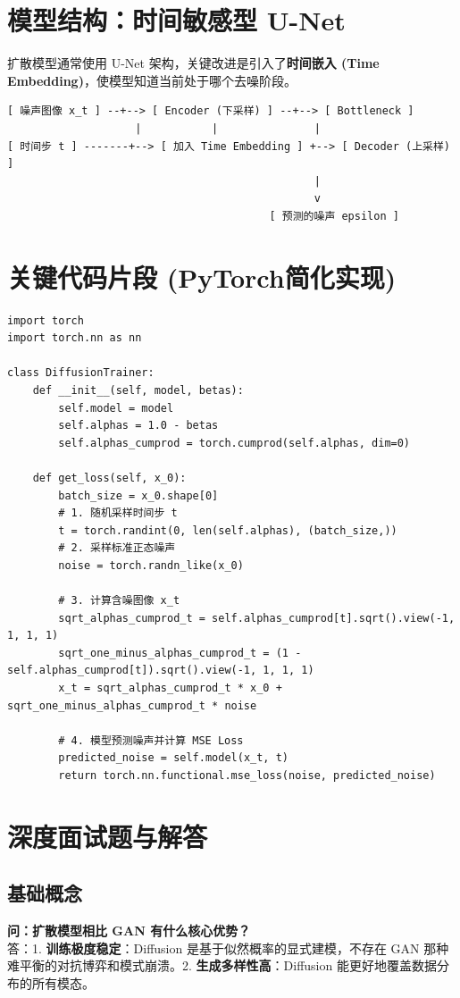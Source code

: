 \documentclass[12pt, a4paper]{article}
\begin{document}
\section{模型结构：时间敏感型 U-Net}
扩散模型通常使用 U-Net 架构，关键改进是引入了\textbf{时间嵌入 (Time Embedding)}，使模型知道当前处于哪个去噪阶段。
\begin{verbatim}
[ 噪声图像 x_t ] --+--> [ Encoder (下采样) ] --+--> [ Bottleneck ]
                    |           |               |
[ 时间步 t ] -------+--> [ 加入 Time Embedding ] +--> [ Decoder (上采样) ]
                                                |
                                                v
                                         [ 预测的噪声 epsilon ]
\end{verbatim}

\section{关键代码片段 (PyTorch简化实现)}
\begin{lstlisting}
import torch
import torch.nn as nn

class DiffusionTrainer:
    def __init__(self, model, betas):
        self.model = model
        self.alphas = 1.0 - betas
        self.alphas_cumprod = torch.cumprod(self.alphas, dim=0)

    def get_loss(self, x_0):
        batch_size = x_0.shape[0]
        # 1. 随机采样时间步 t
        t = torch.randint(0, len(self.alphas), (batch_size,))
        # 2. 采样标准正态噪声
        noise = torch.randn_like(x_0)
        
        # 3. 计算含噪图像 x_t
        sqrt_alphas_cumprod_t = self.alphas_cumprod[t].sqrt().view(-1, 1, 1, 1)
        sqrt_one_minus_alphas_cumprod_t = (1 - self.alphas_cumprod[t]).sqrt().view(-1, 1, 1, 1)
        x_t = sqrt_alphas_cumprod_t * x_0 + sqrt_one_minus_alphas_cumprod_t * noise
        
        # 4. 模型预测噪声并计算 MSE Loss
        predicted_noise = self.model(x_t, t)
        return torch.nn.functional.mse_loss(noise, predicted_noise)
\end{lstlisting}

\section{深度面试题与解答}
\subsection{基础概念}
\textbf{问：扩散模型相比 GAN 有什么核心优势？}\\
答：1. \textbf{训练极度稳定}：Diffusion 是基于似然概率的显式建模，不存在 GAN 那种难平衡的对抗博弈和模式崩溃。2. \textbf{生成多样性高}：Diffusion 能更好地覆盖数据分布的所有模态。
\end{document}
